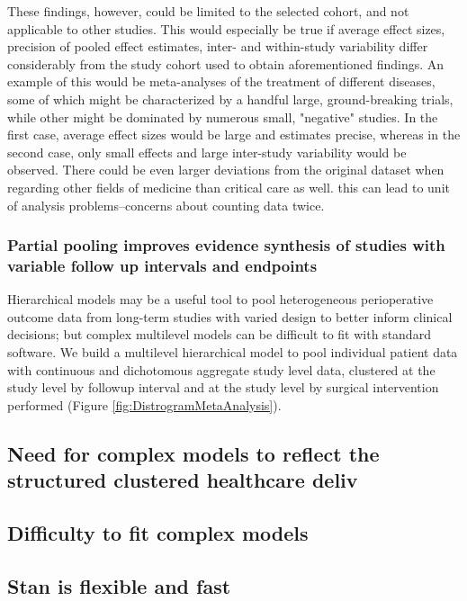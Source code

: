 \documentclass[11pt,notitlepage]{article}
\begin{document}
These findings, however, could be limited to the selected cohort, and not applicable to other studies. This would especially be true if average effect sizes, precision of pooled effect estimates, inter- and within-study variability differ considerably from the study cohort used to obtain aforementioned findings. An example of this would be meta-analyses of the treatment of different diseases, some of which might be characterized by a handful large, ground-breaking trials, while other might be dominated by numerous small, "negative" studies. In the first case, average effect sizes would be large and estimates precise, whereas in the second case, only small effects and large inter-study variability would be observed. There could be even larger deviations from the original dataset when regarding other fields of medicine than critical care as well.
 this can lead to unit of analysis problems--concerns about counting data twice. 

\subsubsection*{Partial pooling improves evidence synthesis of studies with variable follow up intervals and endpoints}
 
Hierarchical models may be a useful tool to pool heterogeneous perioperative outcome data from long-term studies with varied design to better inform clinical decisions\cite{AndreaeJohnsonAbstract2013,Spiegelhalter2004bayesian}; but complex multilevel models can be difficult to fit with standard software. We build a multilevel hierarchical model to pool individual patient data with continuous and dichotomous aggregate study level data, clustered at the study level by followup interval and at the study level by surgical intervention performed (Figure \ref{fig:DistrogramMetaAnalysis}).


\subsection*{Need for complex models to reflect the structured clustered healthcare deliv}

\subsection*{Difficulty to fit complex models}

\subsection*{Stan is flexible and fast}
\end{document}
